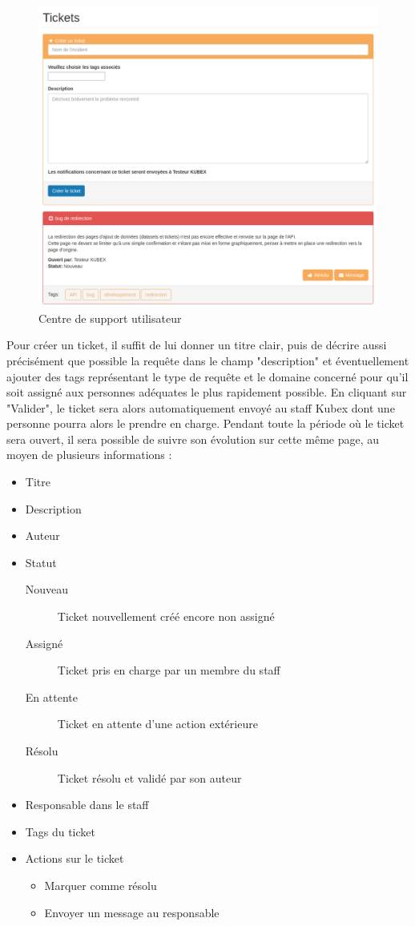 \documentclass[a4paper]{report}
\begin{document}
\begin{figure}[h]
	\includegraphics[width=\textwidth]{images/support.png}
	\caption{\label{fig:support} Centre de support utilisateur}
\end{figure}

Pour créer un ticket, il suffit de lui donner un titre clair, puis de décrire aussi précisément que possible la requête dans le champ "description" et éventuellement ajouter des tags représentant le type de requête et le domaine concerné pour qu'il soit assigné aux personnes adéquates le plus rapidement possible. En cliquant sur "Valider", le ticket sera alors automatiquement envoyé au staff Kubex dont une personne pourra alors le prendre en charge.
Pendant toute la période où le ticket sera ouvert, il sera possible de suivre son évolution sur cette même page, au moyen de plusieurs informations :

\begin{itemize}
	\item Titre
	\item Description
	\item Auteur
	\item Statut
	\begin{description}
		\item[Nouveau] Ticket nouvellement créé encore non assigné
		\item[Assigné] Ticket pris en charge par un membre du staff
		\item[En attente] Ticket en attente d'une action extérieure
		\item[Résolu] Ticket résolu et validé par son auteur
	\end{description}
	\item Responsable dans le staff
	\item Tags du ticket
	\item Actions sur le ticket
	\begin{itemize}
		\item Marquer comme résolu
		\item Envoyer un message au responsable
	\end{itemize}
\end{itemize}
\end{document}
